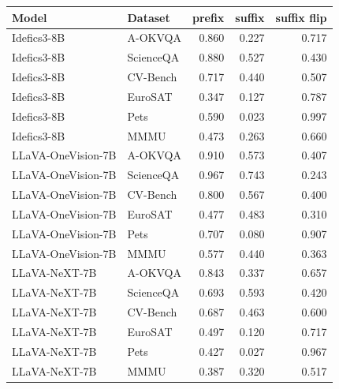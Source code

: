 \begin{tabular}{llrrr}
\toprule
Model & Dataset & prefix & suffix & suffix flip \\
\midrule
Idefics3-8B & A-OKVQA & 0.860 & 0.227 & 0.717 \\
Idefics3-8B & ScienceQA & 0.880 & 0.527 & 0.430 \\
Idefics3-8B & CV-Bench & 0.717 & 0.440 & 0.507 \\
Idefics3-8B & EuroSAT & 0.347 & 0.127 & 0.787 \\
Idefics3-8B & Pets & 0.590 & 0.023 & 0.997 \\
Idefics3-8B & MMMU & 0.473 & 0.263 & 0.660 \\
\midrule
LLaVA-OneVision-7B & A-OKVQA & 0.910 & 0.573 & 0.407 \\
LLaVA-OneVision-7B & ScienceQA & 0.967 & 0.743 & 0.243 \\
LLaVA-OneVision-7B & CV-Bench & 0.800 & 0.567 & 0.400 \\
LLaVA-OneVision-7B & EuroSAT & 0.477 & 0.483 & 0.310 \\
LLaVA-OneVision-7B & Pets & 0.707 & 0.080 & 0.907 \\
LLaVA-OneVision-7B & MMMU & 0.577 & 0.440 & 0.363 \\
\midrule
LLaVA-NeXT-7B & A-OKVQA & 0.843 & 0.337 & 0.657 \\
LLaVA-NeXT-7B & ScienceQA & 0.693 & 0.593 & 0.420 \\
LLaVA-NeXT-7B & CV-Bench & 0.687 & 0.463 & 0.600 \\
LLaVA-NeXT-7B & EuroSAT & 0.497 & 0.120 & 0.717 \\
LLaVA-NeXT-7B & Pets & 0.427 & 0.027 & 0.967 \\
LLaVA-NeXT-7B & MMMU & 0.387 & 0.320 & 0.517 \\
\bottomrule
\end{tabular}
